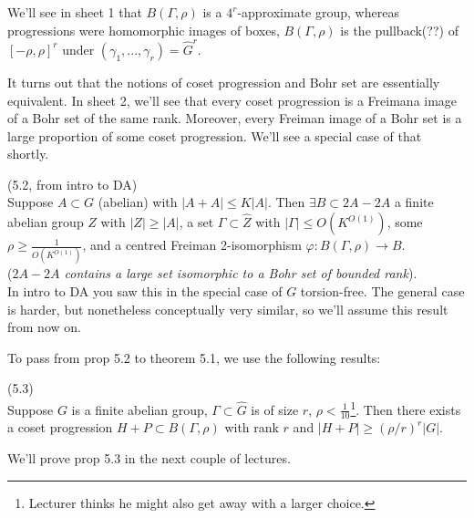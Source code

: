 \documentclass[a4paper]{article}
\begin{document}
We'll see in sheet 1 that $B(\Gamma,\rho)$ is a $4^r$-approximate group, whereas progressions were homomorphic images of boxes, $B(\Gamma,\rho)$ is the pullback(??) of $[-\rho,\rho]^r$ under $(\gamma_1,...,\gamma_r) = \hat{G}^r$.

It turns out that the notions of coset progression and Bohr set are essentially equivalent. In sheet 2, we'll see that every coset progression is a Freimana image of a Bohr set of the same rank. Moreover, every Freiman image of a Bohr set is a large proportion of some coset progression. We'll see a special case of that shortly.

\begin{prop} (5.2, from intro to DA)\\
Suppose $A \subset G$ (abelian) with $|A+A| \leq K|A|$. Then $\exists B \subset 2A-2A$ a finite abelian group $Z$ with $|Z| \geq |A|$, a set $\Gamma \subset \hat{Z}$ with $|\Gamma| \leq O(K^{O(1)})$, some $\rho \geq \frac{1}{O(K^{O(1)})}$, and a centred Freiman 2-isomorphism $\varphi:B(\Gamma,\rho) \to B$.\\
(\emph{$2A-2A$ contains a large set isomorphic to a Bohr set of bounded rank}).\\
In intro to DA you saw this in the special case of $G$ torsion-free. The general case is harder, but nonetheless conceptually very similar, so we'll assume this result from now on.
\end{prop}

To pass from prop 5.2 to theorem 5.1, we use the following results:

\begin{prop} (5.3)\\
Suppose $G$ is a finite abelian group, $\Gamma \subset \hat{G}$ is of size $r$, $\rho<\frac{1}{10}$\footnote{Lecturer thinks he might also get away with a larger choice.}. Then there exists a coset progression $H+P \subset B(\Gamma,\rho)$ with rank $r$ and $|H+P| \geq (\rho/r)^r |G|$.
\end{prop}

We'll prove prop 5.3 in the next couple of lectures.
\end{document}
